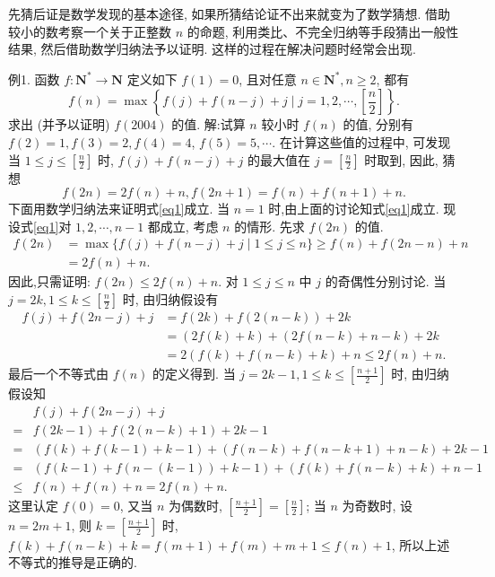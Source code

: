 
先猜后证是数学发现的基本途径, 如果所猜结论证不出来就变为了数学猜想.
借助较小的数考察一个关于正整数 $n$ 的命题, 利用类比、不完全归纳等手段猜出一般性结果, 然后借助数学归纳法予以证明.
这样的过程在解决问题时经常会出现.



例1. 函数 $f: \mathbf{N}^* \rightarrow \mathbf{N}$ 定义如下 $f(1)=0$, 且对任意 $n \in \mathbf{N}^*, n \geqslant 2$, 都有
$$
f(n)=\max \left\{f(j)+f(n-j)+j \mid j=1,2, \cdots,\left[\frac{n}{2}\right]\right\} . \label{eq1}
$$
求出 (并予以证明) $f(2004)$ 的值.
解:试算 $n$ 较小时 $f(n)$ 的值, 分别有 $f(2)=1, f(3)=2, f(4)=4$, $f(5)=5, \cdots$. 在计算这些值的过程中, 可发现当 $1 \leqslant j \leqslant\left[\frac{n}{2}\right]$ 时, $f(j)+ f(n-j)+j$ 的最大值在 $j=\left[\frac{n}{2}\right]$ 时取到, 因此, 猜想
$$
f(2 n)=2 f(n)+n, f(2 n+1)=f(n)+f(n+1)+n . 
$$
下面用数学归纳法来证明式\ref{eq1}成立.
当 $n=1$ 时,由上面的讨论知式\ref{eq1}成立.
现设式\ref{eq1}对 $1,2, \cdots, n-1$ 都成立, 考虑 $n$ 的情形.
先求 $f(2 n)$ 的值.
$$
\begin{aligned}
f(2 n) & =\max \{f(j)+f(n-j)+j \mid 1 \leqslant j \leqslant n\} \geqslant f(n)+f(2 n-n)+n \\
& =2 f(n)+n .
\end{aligned}
$$
因此,只需证明: $f(2 n) \leqslant 2 f(n)+n$.
对 $1 \leqslant j \leqslant n$ 中 $j$ 的奇偶性分别讨论.
当 $j=2 k, 1 \leqslant k \leqslant\left[\frac{n}{2}\right]$ 时, 由归纳假设有
$$
\begin{aligned}
f(j)+f(2 n-j)+j & =f(2 k)+f(2(n-k))+2 k \\
& =(2 f(k)+k)+(2 f(n-k)+n-k)+2 k \\
& =2(f(k)+f(n-k)+k)+n \leqslant 2 f(n)+n .
\end{aligned}
$$
最后一个不等式由 $f(n)$ 的定义得到.
当 $j=2 k-1,1 \leqslant k \leqslant\left[\frac{n+1}{2}\right]$ 时, 由归纳假设知
$$
\begin{aligned}
& f(j)+f(2 n-j)+j \\
= & f(2 k-1)+f(2(n-k)+1)+2 k-1 \\
= & (f(k)+f(k-1)+k-1)+(f(n-k)+f(n-k+1)+n-k)+2 k-1 \\
= & (f(k-1)+f(n-(k-1))+k-1)+(f(k)+f(n-k)+k)+n-1 \\
\leqslant & f(n)+f(n)+n=2 f(n)+n .
\end{aligned}
$$
这里认定 $f(0)=0$, 又当 $n$ 为偶数时, $\left[\frac{n+1}{2}\right]=\left[\frac{n}{2}\right]$; 当 $n$ 为奇数时, 设 $n= 2 m+1$, 则 $k=\left[\frac{n+1}{2}\right]$ 时, $f(k)+f(n-k)+k=f(m+1)+f(m)+m+ 1 \leqslant f(n)+1$, 所以上述不等式的推导是正确的.
